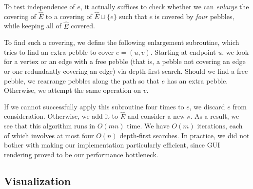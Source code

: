\documentclass[aps,prd,final,twocolumn,letterpaper,nofootinbib]{revtex4-1}
\begin{document}
To test independence of $e$,
it actually suffices to check whether we can \emph{enlarge} the covering of $\hat E$
to a covering of $\hat E \cup \{e\}$
such that $e$ is covered by \emph{four} pebbles,
while keeping all of $\hat E$ covered.

To find such a covering,
we define the following enlargement subroutine,
which tries to find an extra pebble to cover $e = (u, v)$.
Starting at endpoint $u$,
we look for a vertex or an edge with a free pebble
(that is, a pebble not covering an edge
or one redundantly covering an edge)
via depth-first search.
Should we find a free pebble,
we rearrange pebbles along the path so that $e$ has an extra pebble.
Otherwise, we attempt the same operation on $v$.

If we cannot successfully apply this subroutine four times to $e$,
we discard $e$ from consideration.
Otherwise, we add it to $\hat E$ and consider a new $e$.
As a result,
we see that this algorithm runs in $O(mn)$ time.
We have $O(m)$ iterations,
each of which involves at most four $O(n)$ depth-first searches.
In practice, we did not bother with making our implementation particularly efficient,
since GUI rendering proved to be our performance bottleneck.


\subsection{Visualization}
\end{document}
